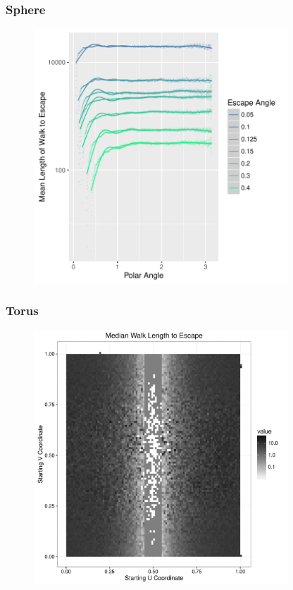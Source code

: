 \documentclass{beamer}
\begin{document}

\begin{frame}
	
	\frametitle{Sphere}
	
	\begin{figure}
		\includegraphics[width=0.85\textwidth]{images/SummaryPlot_L005_04.pdf}
	\end{figure}
	
\end{frame}


\begin{frame}
	
	\frametitle{Torus}
	
	\begin{figure}
		\includegraphics[width=0.85\textwidth]{images/TorusUBand.pdf}
	\end{figure}
	
\end{frame}
\end{document}
